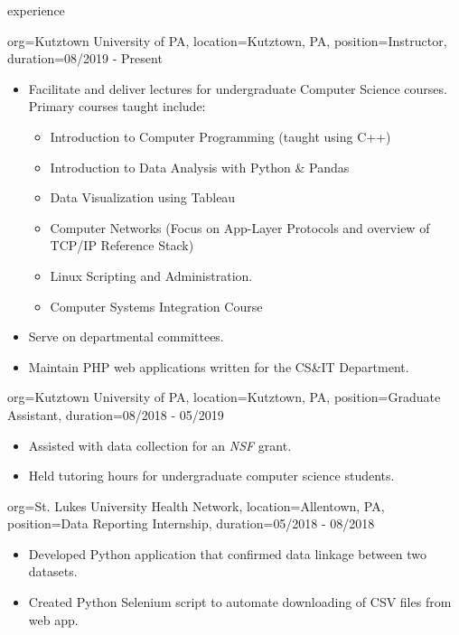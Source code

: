\documentclass{resume}
\begin{document}
\makeheader

\begin{ResumeSection}{experience}
    \begin{ResumeSubsection}{org={Kutztown University of PA}, location={Kutztown, PA}, position={Instructor}, duration={08/2019 - Present}}
        \begin{itemize}
            \item Facilitate and deliver lectures for undergraduate Computer Science courses. Primary courses taught include: 
            \begin{itemize}
                \item Introduction to Computer Programming (taught using C++)
                \item Introduction to Data Analysis with Python \& Pandas
                \item Data Visualization using Tableau
                \item Computer Networks (Focus on App-Layer Protocols and overview of TCP/IP Reference Stack)
                \item Linux Scripting and Administration.
                \item Computer Systems Integration Course
            \end{itemize}
            \item Serve on departmental committees.
            \item Maintain PHP web applications written for the CS\&IT Department.
        \end{itemize}
    \end{ResumeSubsection}    
    \begin{ResumeSubsection}{org={Kutztown University of PA}, location={Kutztown, PA}, position={Graduate Assistant}, duration={08/2018 - 05/2019}}
        \begin{itemize}
            \item Assisted with data collection for an \emph{NSF} grant.
            \item Held tutoring hours for undergraduate computer science students. 
        \end{itemize}
    \end{ResumeSubsection}
    \begin{ResumeSubsection}{org={St. Lukes University Health Network}, location={Allentown, PA}, position={Data Reporting Internship}, duration={05/2018 - 08/2018}}
        \begin{itemize}
            \item Developed Python application that confirmed data linkage between two datasets. 
            \item Created Python Selenium script to automate downloading of CSV files from web app.
        \end{itemize}
    \end{ResumeSubsection}
\end{ResumeSection}
\end{document}
